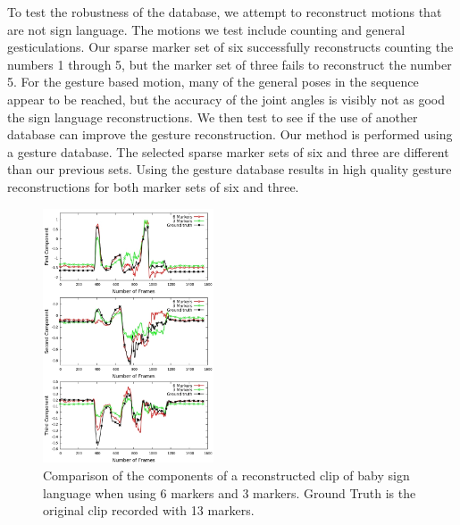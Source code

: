 To test the robustness of the database, we attempt to reconstruct 
motions that are not sign language. The motions we test include 
counting and general gesticulations. Our sparse marker set of six
successfully reconstructs counting the numbers 1 through 5, but the marker
set of three fails to reconstruct the number 5. For the gesture based motion,
many of the general poses in the sequence appear to be reached, but the accuracy
of the joint angles is visibly not as good the sign language reconstructions. We
then test to see if the use of another database can improve the gesture
reconstruction. Our method is performed using a gesture database. The selected
sparse marker sets of six and three are different than our previous sets.
Using the gesture database results in high quality gesture reconstructions
for both marker sets of six and three.



\begin{figure}[ht]
  \centering
  \includegraphics[trim = 28mm 0mm 0mm 0mm,
width=0.45\textwidth]{images/Components_babySigns1.jpg} %
  \caption{Comparison of the components of a reconstructed clip of baby
sign language when using 6 markers and 3 markers. Ground Truth is
the original clip recorded with 13 markers.}
  \label{fig:BabySigns_comps}
\end{figure}


